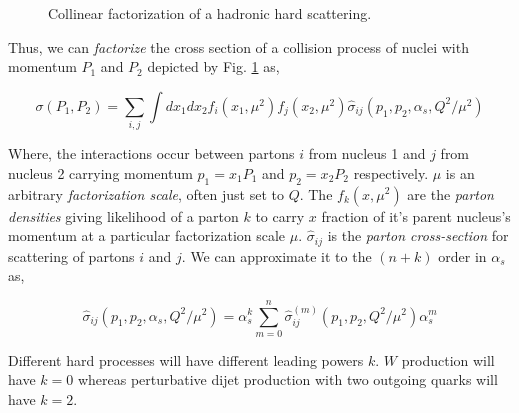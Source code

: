 \begin{figure}[htbp]
	\centering
	\factorizationdiagram
	\caption{Collinear factorization of a hadronic hard scattering.}
	\label{fig:factorization}
\end{figure}

Thus, we can \emph{factorize} the cross section of a collision process of nuclei with momentum \(P_1\) and \(P_2\) depicted by Fig. \ref{fig:factorization} as,

\begin{equation}
	\sigma(P_1, P_2)  = \sum_{i,j} \int dx_1dx_2f_i(x_1, \mu^2)f_j(x_2, \mu^2)\hat{\sigma}_{ij}(p_1, p_2, \alpha_s, Q^2/\mu^2)
	\label{eq:factorization}
\end{equation}

Where, the interactions occur between partons \(i\) from nucleus 1 and \(j\) from nucleus 2 carrying momentum \(p_1 = x_1P_1\) and \(p_2 = x_2P_2\) respectively. \(\mu\) is an arbitrary \emph{factorization scale}, often just set to \(Q\). The \(f_{k}(x, \mu^2)\) are the \emph{parton densities} giving likelihood of a parton \(k\) to carry \(x\) fraction of it's parent nucleus's momentum at a particular factorization scale \(\mu\). \(\hat{\sigma}_{ij}\)  is the \emph{parton cross-section} for scattering of partons \(i\) and \(j\). We can approximate it to the \((n+k)\) order in \(\alpha_s\) as, 

\begin{equation}
	\hat{\sigma}_{ij}(p_1, p_2, \alpha_s, Q^2/\mu^2) = \alpha_s^k \sum_{m=0}^{n}\hat{\sigma}_{ij}^{(m)} (p_1, p_2, Q^2/\mu^2)\alpha_s^m
\end{equation}

Different hard processes will have different leading powers \(k\). \(W\) production will have \(k=0\) whereas perturbative dijet production with two outgoing quarks will have \(k=2\). 


